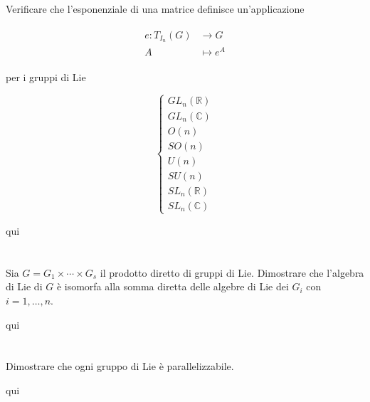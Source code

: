 \begin{tcolorbox}
	Verificare che l'esponenziale di una matrice definisce un'applicazione
	
	\begin{align}
		\begin{split}
			e : T_{I_{n}}(G) &\to G\\
			A &\mapsto e^{A}
		\end{split}
	\end{align}

	per i gruppi di Lie
	
	\begin{equation}
		\begin{cases}
			GL_{n}(\mathbb{R})\\
			GL_{n}(\mathbb{C})\\
			O(n)\\
			SO(n)\\
			U(n)\\
			SU(n)\\
			SL_{n}(\mathbb{R})\\
			SL_{n}(\mathbb{C})
		\end{cases}
	\end{equation}
\end{tcolorbox}

qui

\tocless\section{}\label{es3-11}

\begin{tcolorbox}
	Sia $ G = G_{1} \times \cdots \times G_{s} $ il prodotto diretto di gruppi di Lie. Dimostrare che l'algebra di Lie di $ G $ è isomorfa alla somma diretta delle algebre di Lie dei $ G_{i} $ con $ i=1,\dots,n $.
\end{tcolorbox}

qui

\tocless\section{}\label{es3-12}

\begin{tcolorbox}
	Dimostrare che ogni gruppo di Lie è parallelizzabile.
\end{tcolorbox}

qui
